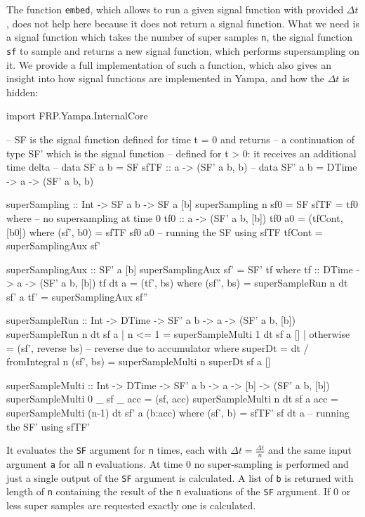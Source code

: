The function \texttt{embed}, which allows to run a given signal function with provided $\Delta t$, does not help here because it does not return a signal function. What we need is a signal function which takes the number of super samples \texttt{n}, the signal function \texttt{sf} to sample and returns a new signal function, which performs supersampling on it. We provide a full implementation of such a function, which also gives an insight into how signal functions are implemented in Yampa, and how the $\Delta t$ is hidden:

\begin{HaskellCode}
import FRP.Yampa.InternalCore

-- SF is the signal function defined for time t = 0 and returns
-- a continuation of type SF' which is the signal function 
-- defined for t > 0: it receives an additional time delta
-- data SF a b  = SF { sfTF :: a -> (SF' a b, b) }
-- data SF' a b = DTime -> a -> (SF' a b, b)

superSampling :: Int -> SF a b -> SF a [b]
superSampling n sf0 = SF { sfTF = tf0 }
  where
    -- no supersampling at time 0
    tf0 :: a -> (SF' a b, [b])
    tf0 a0 = (tfCont, [b0])
      where
        (sf', b0) = sfTF sf0 a0 -- running the SF using sfTF 
        tfCont    = superSamplingAux sf'

    superSamplingAux :: SF' a [b]
    superSamplingAux sf' = SF' tf
      where
        tf :: DTime -> a -> (SF' a b, [b])
        tf dt a = (tf', bs)
          where
            (sf'', bs) = superSampleRun n dt sf' a
            tf'        = superSamplingAux sf''

    superSampleRun :: Int -> DTime -> SF' a b -> a -> (SF' a b, [b])
    superSampleRun n dt sf a 
        | n <= 1    = superSampleMulti 1 dt sf a []
        | otherwise = (sf', reverse bs)  -- reverse due to accumulator
      where
        superDt   = dt / fromIntegral n
        (sf', bs) = superSampleMulti n superDt sf a []

    superSampleMulti :: Int -> DTime -> SF' a b -> a -> [b] -> (SF' a b, [b])
    superSampleMulti 0 _ sf _ acc  = (sf, acc)
    superSampleMulti n dt sf a acc = superSampleMulti (n-1) dt sf' a (b:acc) 
      where
        (sf', b) = sfTF' sf dt a -- running the SF' using sfTF'
\end{HaskellCode}

It evaluates the \texttt{SF} argument for \texttt{n} times, each with $\Delta t = \frac{\Delta t}{n}$ and the same input argument \texttt{a} for all \texttt{n} evaluations. At time 0 no super-sampling is performed and just a single output of the \texttt{SF} argument is calculated. A list of \texttt{b} is returned with length of \texttt{n} containing the result of the \texttt{n} evaluations of the \texttt{SF} argument. If 0 or less super samples are requested exactly one is calculated. %

